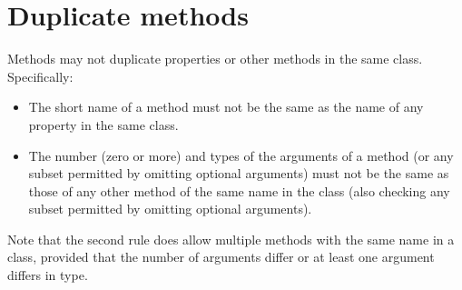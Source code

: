 \section{Duplicate methods}
 
Methods may not duplicate properties or other methods in the same class.
Specifically:
\begin{itemize}
\item 
The short name of a method must not be the same as the name of any
property in the same class.
\item 
The number (zero or more) and types of the arguments of a method (or any
subset permitted by omitting optional arguments) must not be the same as
those of any other method of the same name in the class (also checking
any subset permitted by omitting optional arguments).
\end{itemize}
Note that the second rule does allow multiple methods with the same
name in a class, provided that the number of arguments differ or
at least one argument differs in type.
